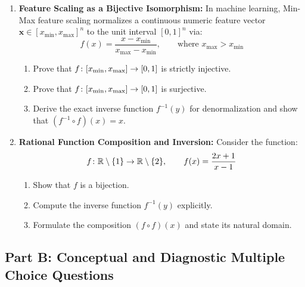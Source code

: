 \begin{enumerate}
    \item \textbf{Feature Scaling as a Bijective Isomorphism:} In machine learning, Min-Max feature scaling normalizes a continuous numeric feature vector $\mathbf{x} \in [x_{\min}, x_{\max}]^n$ to the unit interval $[0, 1]^n$ via:
    $$f(x) = \frac{x - x_{\min}}{x_{\max} - x_{\min}}, \qquad \text{where } x_{\max} > x_{\min}$$
    \begin{enumerate}
        \item Prove that $f \colon [x_{\min}, x_{\max}] \to [0, 1]$ is strictly injective.
        \item Prove that $f \colon [x_{\min}, x_{\max}] \to [0, 1]$ is surjective.
        \item Derive the exact inverse function $f^{-1}(y)$ for denormalization and show that $(f^{-1} \circ f)(x) = x$.
    \end{enumerate}

    \item \textbf{Rational Function Composition and Inversion:} Consider the function:
    $$f \colon \mathbb{R} \setminus \{1\} \to \mathbb{R} \setminus \{2\}, \qquad f(x) = \frac{2x + 1}{x - 1}$$
    \begin{enumerate}
        \item Show that $f$ is a bijection.
        \item Compute the inverse function $f^{-1}(y)$ explicitly.
        \item Formulate the composition $(f \circ f)(x)$ and state its natural domain.
    \end{enumerate}
\end{enumerate}

\subsection*{Part B: Conceptual and Diagnostic Multiple Choice Questions}

